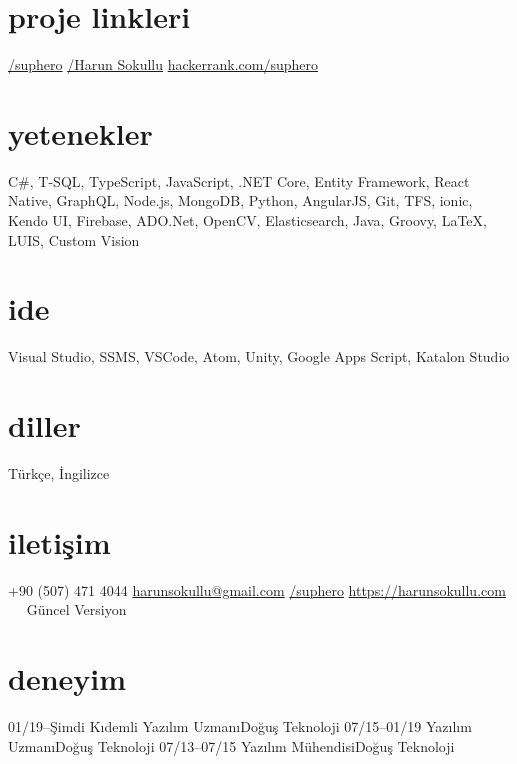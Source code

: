 \documentclass[]{friggeri-cv} %
\begin{document}

\begin{aside}
\section{proje linkleri}
\href{https://github.com/suphero}{\faGithub/suphero}
\href{https://play.google.com/store/apps/developer?id=Harun+Sokullu}{\faAndroid/Harun Sokullu}
\href{https://www.hackerrank.com/suphero}{hackerrank.com/suphero}
\section{yetenekler}
C\#, T-SQL, TypeScript, JavaScript, .NET Core, Entity Framework, React Native, GraphQL, Node.js, MongoDB, Python, AngularJS, Git, TFS, ionic, Kendo UI, Firebase, ADO.Net, OpenCV, Elasticsearch, Java, Groovy, \LaTeX, LUIS, Custom Vision
\section{ide}
Visual Studio, SSMS, VSCode, Atom, Unity, Google Apps Script, Katalon Studio
\section{diller}
Türkçe, İngilizce
\section{iletişim}
+90 (507) 471 4044
\href{mailto:harunsokullu@gmail.com}{harunsokullu@gmail.com}
\href{https://www.linkedin.com/in/suphero}{\faLinkedin/suphero}
\href{https://harunsokullu.com}{https://harunsokullu.com}
~~
Güncel Versiyon
\end{aside}

\section{deneyim}

\begin{entrylist}

\entry
{01/19--Şimdi}
{Kıdemli Yazılım Uzmanı}{Doğuş Teknoloji}{}
\entry
{07/15--01/19}
{Yazılım Uzmanı}{Doğuş Teknoloji}{}
\entry
{07/13--07/15}
{Yazılım Mühendisi}{Doğuş Teknoloji}{}

\end{entrylist}
\end{document}
